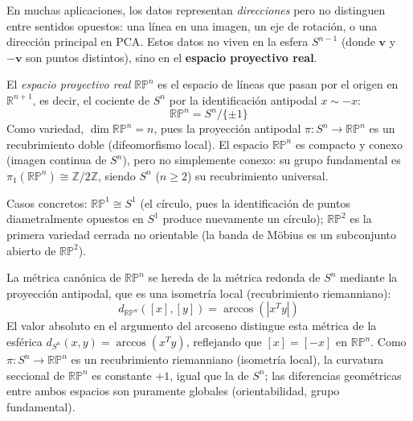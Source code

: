 En muchas aplicaciones, los datos representan \textit{direcciones} pero no distinguen entre sentidos opuestos: una línea en una imagen, un eje de rotación, o una dirección principal en \gls{PCA}. Estos datos no viven en la esfera $S^{n-1}$ (donde $\mathbf{v}$ y $-\mathbf{v}$ son puntos distintos), sino en el \textbf{espacio proyectivo real}.

\begin{definition}\label{def:espacio_proyectivo}
El \textit{espacio proyectivo real} $\mathbb{RP}^n$ es el espacio de líneas que pasan por el origen en $\mathbb{R}^{n+1}$, es decir, el cociente de $S^n$ por la identificación antipodal $x \sim -x$:
\[
\mathbb{RP}^n = S^n / \{\pm 1\}
\]
Como variedad, $\dim \mathbb{RP}^n = n$, pues la proyección antipodal $\pi: S^n \to \mathbb{RP}^n$ es un recubrimiento doble (difeomorfismo local). El espacio $\mathbb{RP}^n$ es compacto y conexo (imagen continua de $S^n$), pero no simplemente conexo: su grupo fundamental es $\pi_1(\mathbb{RP}^n) \cong \mathbb{Z}/2\mathbb{Z}$, siendo $S^n$ ($n \geq 2$) su recubrimiento universal.

Casos concretos: $\mathbb{RP}^1 \cong S^1$ (el círculo, pues la identificación de puntos diametralmente opuestos en $S^1$ produce nuevamente un círculo); $\mathbb{RP}^2$ es la primera variedad cerrada no orientable (la banda de Möbius es un subconjunto abierto de $\mathbb{RP}^2$).
\end{definition}

La métrica canónica de $\mathbb{RP}^n$ se hereda de la métrica redonda de $S^n$ mediante la proyección antipodal, que es una isometría local (recubrimiento riemanniano):
\[
d_{\mathbb{RP}^n}([x], [y]) = \arccos(|x^T y|)
\]
El valor absoluto en el argumento del arcoseno distingue esta métrica de la esférica $d_{S^n}(x,y) = \arccos(x^T y)$, reflejando que $[x] = [-x]$ en $\mathbb{RP}^n$. Como $\pi: S^n \to \mathbb{RP}^n$ es un recubrimiento riemanniano (isometría local), la curvatura seccional de $\mathbb{RP}^n$ es constante $+1$, igual que la de $S^n$; las diferencias geométricas entre ambos espacios son puramente globales (orientabilidad, grupo fundamental).

